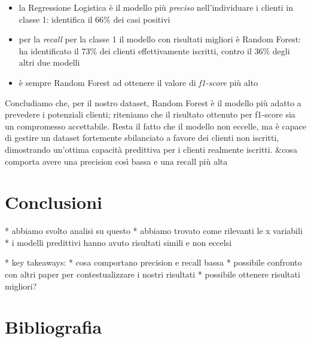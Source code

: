 \documentclass[11,5pt, a4paper]{article}
\begin{document}
\begin{itemize}
    \item la Regressione Logistica è il modello più \textit{preciso} nell’individuare i clienti in classe 1: identifica il 66\% dei casi positivi
\end{itemize}

\begin{itemize}
    \item per la \textit{recall} per la classe 1 il modello con risultati migliori è Random Forest: ha identificato il 73\% dei clienti effettivamente iscritti, contro il 36\% degli altri due modelli
\end{itemize}

\begin{itemize}
    \item è sempre Random Forest ad ottenere il valore di \textit{f1-score} più alto
\end{itemize}

Concludiamo che, per il nostro dataset, Random Forest è il modello più adatto a prevedere i potenziali clienti; riteniamo che il risultato ottenuto per f1-score sia un compromesso accettabile. Resta il fatto che il modello non eccelle, ma è capace di gestire un dataset fortemente sbilanciato a favore dei clienti non iscritti, dimostrando un'ottima capacità predittiva per i clienti realmente iscritti.
&cosa comporta avere una precision così bassa e una recall più alta


\section{Conclusioni}
* abbiamo svolto analisi su questo
* abbiamo trovato come rilevanti le x variabili
* i modelli predittivi hanno avuto risultati simili e non eccelsi

* key takeaways: * cosa comportano precision e recall bassa * possibile confronto con altri paper per contestualizzare i nostri risultati * possibile ottenere risultati migliori?


\section{Bibliografia}


\end{document}

